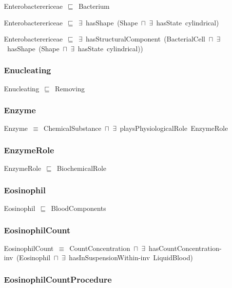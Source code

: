 \documentclass{article}
\begin{document}
Enterobacterericeae~\ensuremath{\sqsubseteq}~Bacterium~

Enterobacterericeae~\ensuremath{\sqsubseteq}~\ensuremath{\exists}~hasShape~(Shape~\ensuremath{\sqcap}~\ensuremath{\exists}~hasState~cylindrical)~

Enterobacterericeae~\ensuremath{\sqsubseteq}~\ensuremath{\exists}~hasStructuralComponent~(BacterialCell~\ensuremath{\sqcap}~\ensuremath{\exists}~hasShape~(Shape~\ensuremath{\sqcap}~\ensuremath{\exists}~hasState~cylindrical))~

\subsubsection*{Enucleating}

Enucleating~\ensuremath{\sqsubseteq}~Removing~

\subsubsection*{Enzyme}

Enzyme~\ensuremath{\equiv}~ChemicalSubstance~\ensuremath{\sqcap}~\ensuremath{\exists}~playsPhysiologicalRole~EnzymeRole

\subsubsection*{EnzymeRole}

EnzymeRole~\ensuremath{\sqsubseteq}~BiochemicalRole~

\subsubsection*{Eosinophil}

Eosinophil~\ensuremath{\sqsubseteq}~BloodComponents~

\subsubsection*{EosinophilCount}

EosinophilCount~\ensuremath{\equiv}~CountConcentration~\ensuremath{\sqcap}~\ensuremath{\exists}~hasCountConcentration-inv~(Eosinophil~\ensuremath{\sqcap}~\ensuremath{\exists}~hasInSuspensionWithin-inv~LiquidBlood)

\subsubsection*{EosinophilCountProcedure}
\end{document}
